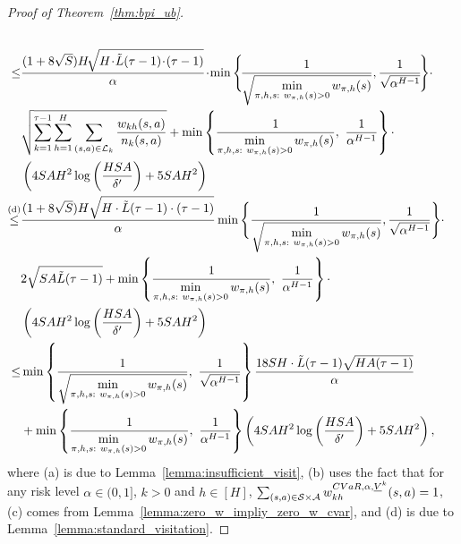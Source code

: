 \begin{proof}[Proof of Theorem~\ref{thm:bpi_ub}]
\begin{align*}
		\\
		\leq & \frac{(1+8\sqrt{S}) H \!\sqrt{H \!\cdot\! \tilde{L}(\tau-1) \!\cdot\! (\tau-1)} }{\alpha} \!\cdot\! \min \Bigg\{\! \frac{ 1 }{\sqrt{\min \limits_{\begin{subarray}{c}\pi,h,s:\  w_{\pi,h}(s)>0\end{subarray}} w_{\pi,h}(s)}}, \frac{1}{\sqrt{\alpha^{H-1}}} \!\Bigg\} \cdot \\& \sqrt{\sum_{k=1}^{\tau-1} \sum_{h=1}^{H} \sum_{(s,a) \in \cL_k} \frac{w_{kh}(s,a)}{n_k(s,a)} } + \min \lbr{\frac{ 1 }{\min \limits_{\begin{subarray}{c}\pi,h,s:\  w_{\pi,h}(s)>0\end{subarray}} w_{\pi,h}(s)},\ \frac{1}{\alpha^{H-1}}} \cdot\\&  \sbr{ 4SAH^2 \log\sbr{\frac{HSA}{\delta'}} + 5SAH^2 }
		\\
		\overset{\textup{(d)}}{\leq} & \frac{(1+8\sqrt{S})H\sqrt{H \cdot \tilde{L}(\tau-1) \cdot (\tau-1)}}{\alpha } \min \Bigg\{\frac{ 1 }{\sqrt{\min \limits_{\begin{subarray}{c}\pi,h,s:\  w_{\pi,h}(s)>0\end{subarray}} w_{\pi,h}(s)}}, \frac{1}{\sqrt{\alpha^{H-1}}} \Bigg\} \cdot\\& 2 \sqrt{SA \tilde{L}(\tau-1)} 
		+ \min \lbr{\frac{ 1 }{\min \limits_{\begin{subarray}{c}\pi,h,s:\  w_{\pi,h}(s)>0\end{subarray}} w_{\pi,h}(s)},\ \frac{1}{\alpha^{H-1}}}  \cdot \\& \sbr{ 4SAH^2 \log\sbr{\frac{HSA}{\delta'}} + 5SAH^2 }
		\\
		\leq & \min \lbr{\frac{ 1 }{\sqrt{\min \limits_{\begin{subarray}{c}\pi,h,s:\  w_{\pi,h}(s)>0\end{subarray}} w_{\pi,h}(s)}},\ \frac{1}{\sqrt{\alpha^{H-1}}} } \frac{18SH \cdot \tilde{L}(\tau-1) \sqrt{HA(\tau-1)}}{\alpha } \\& + \min \lbr{\frac{ 1 }{\min \limits_{\begin{subarray}{c}\pi,h,s:\  w_{\pi,h}(s)>0\end{subarray}} w_{\pi,h}(s)},\ \frac{1}{\alpha^{H-1}}}  \sbr{ 4SAH^2 \log\sbr{\frac{HSA}{\delta'}} + 5SAH^2 } ,
	\end{align*}
	where (a) is due to Lemma~\ref{lemma:insufficient_visit}, (b) uses the fact that for any risk level $\alpha \in (0,1]$, $k>0$ and $h \in [H]$, $\sum_{(s,a) \in \mathcal{S} \times \mathcal{A}} w_{kh}^{CVaR,\alpha,\underline{V}^{k}}(s,a)=1$, (c) comes from Lemma~\ref{lemma:zero_w_impliy_zero_w_cvar}, and (d) is due to Lemma~\ref{lemma:standard_visitation}.
	

\end{proof}
